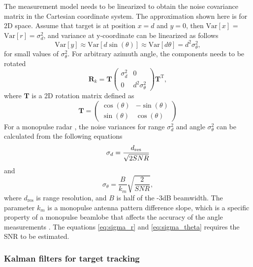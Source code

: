 \documentclass[english, 12pt, a4paper, elec, utf8, a-1b, online]{aaltothesis}
\renewcommand{\vec}[1]{\mathbf{#1}}
\newcommand{\ocov}{\vec{R}_k}
\newcommand{\transpose}[1]{#1^\text{T}}
\newcommand{\rotmat}{\mathbf{T}}
\newcommand{\Var}[1]{\text{Var}\left[ #1 \right]}
\begin{document}
The measurement model needs to be linearized to obtain the noise covariance matrix in the Cartesian coordinate system.
The approximation shown here is for 2D space.
Assume that target is at position $x=d$ and $y=0$, then $\Var{x}$ = $\Var{r} = \sigma_d^2$, and variance at y-coordinate can be linearized as follows
\begin{equation*}
    \Var{y} \approx \Var{d \sin\left(\theta\right)} \approx \Var{d \theta} = d^2\sigma_\theta^2,
\end{equation*} 
for small values of $\sigma_\theta^2$.
For arbitrary azimuth angle, the components needs to be rotated
\begin{equation} \label{eq:cartesian_measurement_covariance}
    \ocov = \rotmat 
    \begin{pmatrix}
            \sigma_d^2 & 0 \\
            0 & d^2 \sigma_\theta^2
    \end{pmatrix}
    \transpose{\rotmat},
\end{equation}
where $\rotmat$ is a 2D rotation matrix defined as
\begin{equation}
    \rotmat = 
    \begin{pmatrix}
            \cos(\theta) & -\sin(\theta) \\
            \sin(\theta) & \cos(\theta)
    \end{pmatrix}
\end{equation}
For a monopulse radar \cite{Sherman2011}, the noise variances for range $\sigma_d^2$ and angle $\sigma_\theta^2$ can be calculated from the following equations \cite{Curry2011}
\begin{equation}
    \sigma_d =  \frac{d_\text{res}}{\sqrt{2 SNR}}  \label{eq:sigma_r}\\
\end{equation}
and
\begin{equation}
    \sigma_\theta =  \frac{B}{k_m} \sqrt{\frac{2}{SNR}} \label{eq:sigma_theta},
\end{equation}
where $d_\text{res}$ is range resolution, and $B$ is half of the -3dB beamwidth. 
The parameter $k_m$ is a monopulse antenna pattern difference slope, which is a specific property of a monopulse beamlobe that affects the accuracy of the angle measurements \cite{Sherman2011}.
The equations \eqref{eq:sigma_r} and \eqref{eq:sigma_theta} requires the SNR to be estimated.

\subsubsection{Kalman filters for target tracking} \label{sec:kalman_filter}
\end{document}

